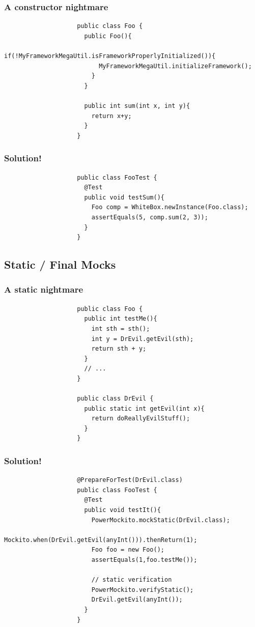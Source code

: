 \documentclass{beamer}
\begin{document}
			\begin{frame}[fragile]
				\frametitle{A constructor nightmare}

				\begin{lstlisting}
					public class Foo {
					  public Foo(){
					    if(!MyFrameworkMegaUtil.isFrameworkProperlyInitialized()){
					      MyFrameworkMegaUtil.initializeFramework();	
					    }
					  }

					  public int sum(int x, int y){
					    return x+y;
					  }
					}
				\end{lstlisting}
			\end{frame}

			\begin{frame}[fragile]
				\frametitle{Solution!}

				\begin{lstlisting}
					public class FooTest {
					  @Test
					  public void testSum(){
					    Foo comp = WhiteBox.newInstance(Foo.class);
					    assertEquals(5, comp.sum(2, 3));
					  }
					}
				\end{lstlisting}
			\end{frame}

		\subsection{Static / Final Mocks}

			\begin{frame}[fragile]
				\frametitle{A static nightmare}

				\begin{lstlisting}
					public class Foo {
					  public int testMe(){
					    int sth = sth();
					    int y = DrEvil.getEvil(sth);	
					    return sth + y;
					  }
					  // ...
					}

					public class DrEvil {
					  public static int getEvil(int x){
					    return doReallyEvilStuff();
					  }
					}
				\end{lstlisting}
			\end{frame}

			\begin{frame}[fragile]
				\frametitle{Solution!}

				\begin{lstlisting}
					@PrepareForTest(DrEvil.class)
					public class FooTest {
					  @Test
					  public void testIt(){
					    PowerMockito.mockStatic(DrEvil.class);
					    Mockito.when(DrEvil.getEvil(anyInt())).thenReturn(1);
					    Foo foo = new Foo();
					    assertEquals(1,foo.testMe());

					    // static verification
					    PowerMockito.verifyStatic();
					    DrEvil.getEvil(anyInt());
					  }
					}
				\end{lstlisting}
			\end{frame}
\end{document}
